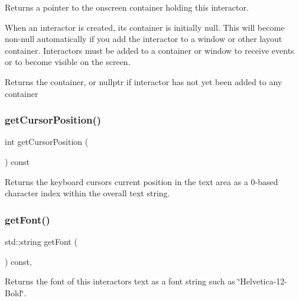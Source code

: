Returns a pointer to the onscreen container holding this interactor. 

When an interactor is created, its container is initially null. This will become non-\/null automatically if you add the interactor to a window or other layout container. Interactors must be added to a container or window to receive events or to become visible on the screen. \begin{DoxyReturn}{Returns}
the container, or nullptr if interactor has not yet been added to any container 
\end{DoxyReturn}
\mbox{\label{classGTextArea_aa85d2267b4534eb372cd3114ea61ba3b}} 
\subsubsection{\texorpdfstring{get\+Cursor\+Position()}{getCursorPosition()}}
{\footnotesize\ttfamily int get\+Cursor\+Position (\begin{DoxyParamCaption}{ }\end{DoxyParamCaption}) const\hspace{0.3cm}{\ttfamily [virtual]}}



Returns the keyboard cursor\textquotesingle{}s current position in the text area as a 0-\/based character index within the overall text string. 

\mbox{\label{classGInteractor_a894a5502900794eeb27d084c21f1d77d}} 
\subsubsection{\texorpdfstring{get\+Font()}{getFont()}}
{\footnotesize\ttfamily std\+::string get\+Font (\begin{DoxyParamCaption}{ }\end{DoxyParamCaption}) const\hspace{0.3cm}{\ttfamily [virtual]}, {\ttfamily [inherited]}}



Returns the font of this interactor\textquotesingle{}s text as a font string such as \char`\"{}\+Helvetica-\/12-\/\+Bold\char`\"{}. 


